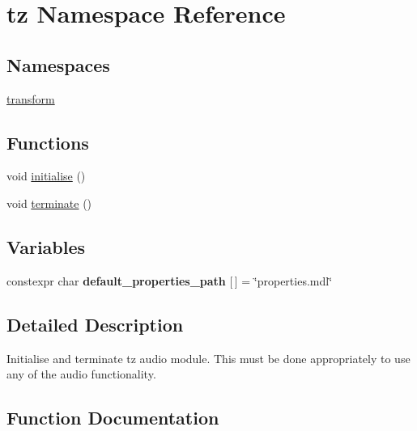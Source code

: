 \hypertarget{namespacetz}{}\section{tz Namespace Reference}
\label{namespacetz}
\subsection*{Namespaces}
\begin{DoxyCompactItemize}
\item 
 \mbox{\hyperlink{namespacetz_1_1transform}{transform}}
\end{DoxyCompactItemize}
\subsection*{Functions}
\begin{DoxyCompactItemize}
\item 
void \mbox{\hyperlink{namespacetz_aeb2530fee0e452e5ba5f4d0d0ebaa797}{initialise}} ()
\item 
void \mbox{\hyperlink{namespacetz_a0a5d1e375e7e82fcd12a8b74b8012bae}{terminate}} ()
\end{DoxyCompactItemize}
\subsection*{Variables}
\begin{DoxyCompactItemize}
\item 
\mbox{\label{namespacetz_ad65b104d9b1d4740bf069e7d33a2da1d}} 
constexpr char {\bfseries default\+\_\+properties\+\_\+path} \mbox{[}$\,$\mbox{]} = \char`\"{}properties.\+mdl\char`\"{}
\end{DoxyCompactItemize}


\subsection{Detailed Description}
Initialise and terminate tz audio module. This must be done appropriately to use any of the audio functionality. 

\subsection{Function Documentation}
\mbox{\label{namespacetz_aeb2530fee0e452e5ba5f4d0d0ebaa797}} 
